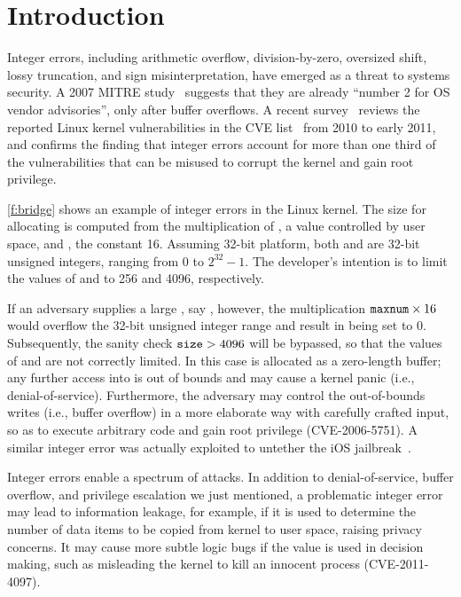 \section{Introduction}
\label{s:intro}

Integer errors, including arithmetic overflow, division-by-zero,
oversized shift, lossy truncation, and sign misinterpretation, have
emerged as a threat to systems security.  A 2007 MITRE
study~\cite{christey:vuln} suggests that they are already ``number
2 for OS vendor advisories'', only after buffer overflows.  A recent
survey~\cite{chen:kbugs} reviews the reported Linux kernel
vulnerabilities in the CVE list~\cite{cve} from 2010 to early 2011,
and confirms the finding that integer errors account for more than
one third of the vulnerabilities that can be misused to corrupt the
kernel and gain root privilege.

\autoref{f:bridge} shows an example of integer errors in the Linux
kernel.  The size for allocating  is computed from the
multiplication of , a value controlled by user space,
and , the constant 16.  Assuming
32-bit platform, both  and  are 32-bit unsigned
integers, ranging from 0 to $2^{32} - 1$.
The developer's intention is to limit the values of 
 and  to 256 and 4096, respectively.

If an adversary supplies a large , say
, however, the multiplication $\texttt{maxnum} \times 16$ would
overflow the 32-bit unsigned integer range and result in 
being set to 0.  Subsequently, the sanity check $\texttt{size} > 4096$
will be bypassed, so that the values of  and 
are not correctly limited.  In this case  is allocated as
a zero-length buffer; any further access into  is out of
bounds and may cause a kernel panic (i.e., denial-of-service).
Furthermore, the adversary may control the out-of-bounds writes
(i.e., buffer overflow) in a more elaborate way with carefully
crafted input, so as to execute arbitrary code and gain root
privilege (CVE-2006-5751).  A similar integer error was
actually exploited to untether the iOS jailbreak~\cite{esser:ios}.

Integer errors enable a spectrum of attacks.  In addition to
denial-of-service, buffer overflow, and privilege escalation we
just mentioned, a problematic integer error may lead to information
leakage, for example, if it is used to determine the number of data
items to be copied from kernel to user space, raising privacy
concerns.  It may cause more subtle logic bugs if the value is used
in decision making, such as misleading the kernel to kill an innocent
process (CVE-2011-4097).

